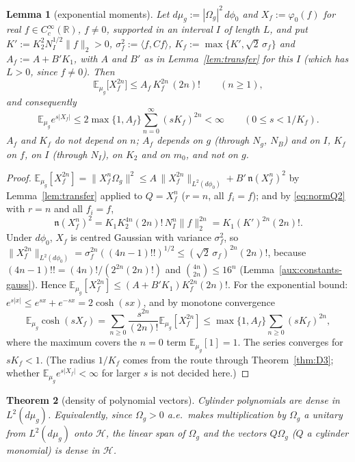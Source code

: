 \documentclass[11pt,a4paper]{article}
\theoremstyle{plain}
\newtheorem{theorem}{Theorem}[section]
\newtheorem{lemma}[theorem]{Lemma}
\theoremstyle{definition}
\theoremstyle{plain}
\theoremstyle{definition}
\newcommand{\R}{\mathbb{R}}
\newcommand{\E}{\mathbb{E}}
\newcommand{\HH}{\mathcal{H}}
\newcommand{\Om}{\Omega}
\newcommand{\ip}[2]{\langle #1,#2\rangle}
\begin{document}
\begin{lemma}[exponential moments]\label{lem:expmom}
Let $d\mu_g:=|\Om_g|^2\,d\phi_0$ and $X_f:=\varphi_0(f)$ for real
$f\in C_c^\infty(\R)$, $f\ne0$, supported in an interval $I$ of length $L$, and put
$K':=K_2^{2}N_I^{1/2}\|f\|_2>0$, $\sigma_f^2:=\ip f{Cf}$, $K_f:=\max\{K',\sqrt2\,\sigma_f\}$
and $A_f:=A+B'K_1$, with $A$ and $B'$ as in Lemma~\ref{lem:transfer} for this $I$ (which
has $L>0$, since $f\ne0$). Then
\[
 \E_{\mu_g}\bigl[X_f^{2n}\bigr]\le A_f\,K_f^{2n}\,(2n)! \qquad(n\ge1),
\]
and consequently
\[
 \E_{\mu_g}e^{s|X_f|}
 \le2\max\{1,A_f\}\sum_{n=0}^\infty(sK_f)^{2n}<\infty
 \qquad(0\le s<1/K_f) .
\]
$A_f$ and $K_f$ do not depend on $n$; $A_f$ depends on $g$ (through $N_g$, $N_B$) and on
$I$, $K_f$ on $f$, on $I$ (through $N_I$), on $K_2$ and on $m_0$, and not on $g$.
\end{lemma}

\begin{proof}
$\E_{\mu_g}[X_f^{2n}]=\|X_f^n\Om_g\|^2\le A\,\|X_f^{2n}\|_{L^2(d\phi_0)}+B'\,\mathfrak n(X_f^n)^2$
by Lemma~\ref{lem:transfer} applied to $Q=X_f^n$ ($r=n$, all $f_i=f$); and by
\eqref{eq:normQ2} with $r=n$ and all $f_i=f$,
\[
 \mathfrak n(X_f^n)^2=K_1K_2^{4n}(2n)!\,N_I^{n}\|f\|_2^{2n}
 =K_1(K')^{2n}(2n)! .
\]
Under $d\phi_0$, $X_f$ is centred Gaussian with variance $\sigma_f^2$, so
$\|X_f^{2n}\|_{L^2(d\phi_0)}=\sigma_f^{2n}((4n-1)!!)^{1/2}\le(\sqrt2\,\sigma_f)^{2n}(2n)!$,
because $(4n-1)!!=(4n)!/(2^{2n}(2n)!)$ and $\binom{4n}{2n}\le16^n$
(Lemma~\ref{aux:constants-gauss}).  Hence
$\E_{\mu_g}[X_f^{2n}]\le(A+B'K_1)K_f^{2n}(2n)!$.
For the exponential bound: $e^{s|x|}\le e^{sx}+e^{-sx}=2\cosh(sx)$, and by monotone
convergence
\[
 \E_{\mu_g}\cosh(sX_f)=\sum_{n\ge0}\frac{s^{2n}}{(2n)!}\E_{\mu_g}[X_f^{2n}]
 \le\max\{1,A_f\}\sum_{n\ge0}(sK_f)^{2n},
\]
where the maximum covers the $n=0$ term $\E_{\mu_g}[1]=1$. The series converges for
$sK_f<1$.  (The radius $1/K_f$ comes from the route through Theorem~\ref{thm:D3}; whether
$\E_{\mu_g}e^{s|X_f|}<\infty$ for larger $s$ is not decided here.)
\end{proof}

\begin{theorem}[density of polynomial vectors]\label{thm:dense}
Cylinder polynomials are dense in $L^2(d\mu_g)$. Equivalently, since $\Om_g>0$ a.e.\ makes
multiplication by $\Om_g$ a unitary from $L^2(d\mu_g)$ onto $\HH$, the linear span of
$\Om_g$ and the vectors $Q\Om_g$ ($Q$ a cylinder monomial) is dense in $\HH$.
\end{theorem}
\end{document}
